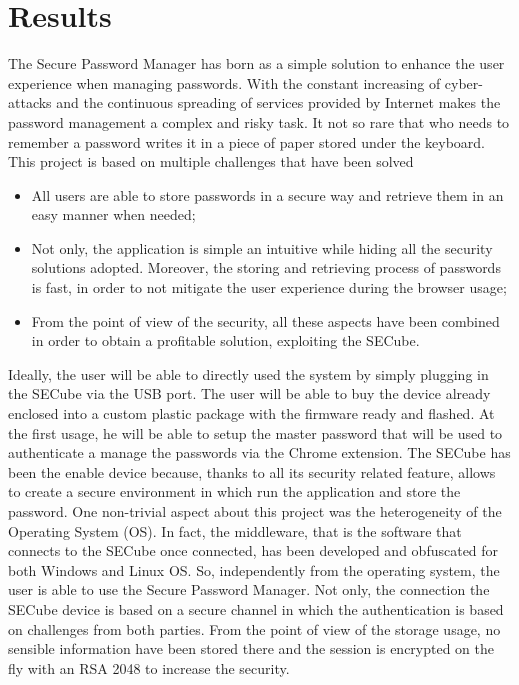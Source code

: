 \chapter{Results}

The Secure Password Manager has born as a simple solution to enhance the user experience when managing passwords. With the constant increasing of cyber-attacks and the continuous spreading of services provided by Internet makes the password management a complex and risky task. It not so rare that who needs to remember a password writes it in a piece of paper stored under the keyboard.\newline\newline
This project is based on multiple challenges that have been solved
\begin{itemize}
	\item All users are able to store passwords in a secure way and retrieve them in an easy manner when needed;
	\item Not only, the application is simple an intuitive while hiding all the security solutions adopted. Moreover, the storing and retrieving process of passwords is fast, in order to not mitigate the user experience during the browser usage;
	\item From the point of view of the security, all these aspects have been combined in order to obtain a profitable solution, exploiting the SECube.
\end{itemize}

Ideally, the user will be able to directly used the system by simply plugging in the SECube via the USB port. The user will be able to buy the device already enclosed into a custom plastic package with the firmware ready and flashed. At the first usage, he will be able to setup the master password that will be used to authenticate a manage the passwords via the Chrome extension. The SECube has been the enable device because, thanks to all its security related feature, allows to create a secure environment in which run the application and store the password.\newline\newline
One non-trivial aspect about this project was the heterogeneity of the Operating System (OS). In fact, the middleware, that is the software that connects to the SECube once connected, has been developed and obfuscated for both Windows and Linux OS. So, independently from the operating system, the user is able to use the Secure Password Manager. Not only, the connection the SECube device is based on a secure channel in which the authentication is based on challenges from both parties. From the point of view of the storage usage, no sensible information have been stored there and the session is encrypted on the fly with an RSA 2048 to increase the security. 


